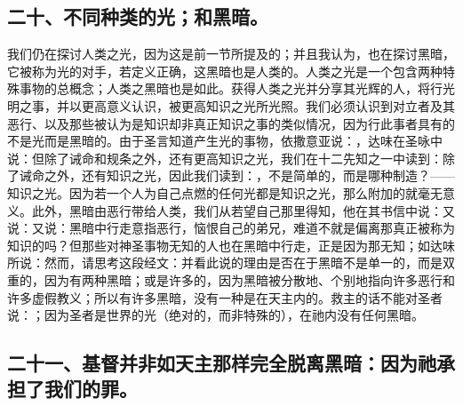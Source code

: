 
\subsection{二十、不同种类的光；和黑暗。}

我们仍在探讨人类之光，因为这是前一节所提及的；并且我认为，也在探讨黑暗，它被称为光的对手，若定义正确，这黑暗也是人类的。人类之光是一个包含两种特殊事物的总概念；人类之黑暗也是如此。获得人类之光并分享其光辉的人，将行光明之事，并以更高意义认识，被更高知识之光所光照。我们必须认识到对立者及其恶行、以及那些被认为是知识却非真正知识之事的类似情况，因为行此事者具有的不是光而是黑暗的。由于圣言知道产生光的事物，依撒意亚说：，达味在圣咏中说：但除了诫命和规条之外，还有更高知识之光，我们在十二先知之一中读到：除了诫命之外，还有知识之光，因此我们读到：，不是简单的，而是哪种制造？——知识之光。因为若一个人为自己点燃的任何光都是知识之光，那么附加的就毫无意义。此外，黑暗由恶行带给人类，我们从若望自己那里得知，他在其书信中说：又说：又说：黑暗中行走意指恶行，恼恨自己的弟兄，难道不就是偏离那真正被称为知识的吗？但那些对神圣事物无知的人也在黑暗中行走，正是因为那无知；如达味所说：然而，请思考这段经文：并看此说的理由是否在于黑暗不是单一的，而是双重的，因为有两种黑暗；或是许多的，因为黑暗被分散地、个别地指向许多恶行和许多虚假教义；所以有许多黑暗，没有一种是在天主内的。救主的话不能对圣者说：；因为圣者是世界的光（绝对的，而非特殊的），在祂内没有任何黑暗。\par


\subsection{二十一、基督并非如天主那样完全脱离黑暗：因为祂承担了我们的罪。}

